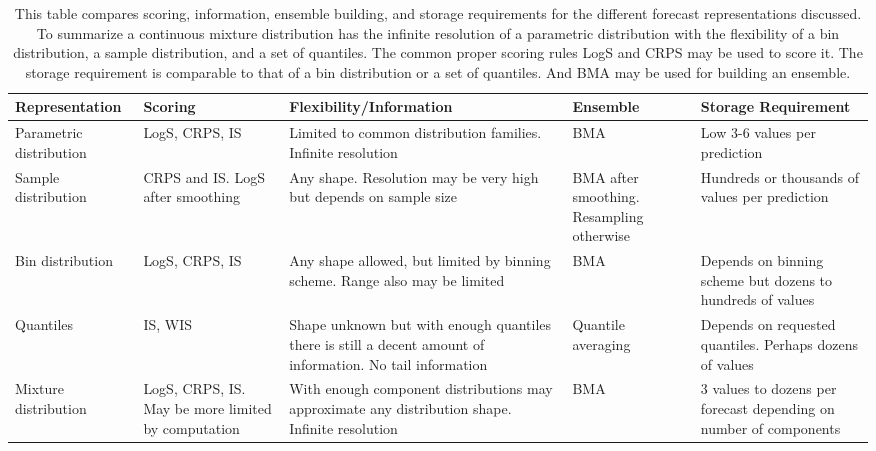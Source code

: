 \documentclass[11pt,notitlepage]{isuthesis}
\begin{document}
\begin{flushleft}

  \begin{table}
    \begin{center}
    \captionsetup{font=scriptsize}
    \begin{tabular}{ | p{2.4cm} || p{3cm} | p{4cm} | p{3cm} | p{3.5cm} |}
    \hline
    \textbf{Representation} & \textbf{Scoring} & 
    \textbf{Flexibility/Information} & \textbf{Ensemble} &
    \textbf{Storage Requirement}
    \\ \hline \hline

    Parametric distribution & LogS, CRPS, IS & Limited to common 
    distribution families. 
    Infinite resolution
    & BMA & Low 3-6 values per prediction \\ \hline
    
    Sample distribution & CRPS and IS. LogS after smoothing & Any shape. 
    Resolution may be
    very high but depends on sample size & BMA after smoothing. Resampling 
    otherwise & 
    Hundreds or thousands of values per prediction
    \\ \hline
    
    Bin distribution & LogS, CRPS, IS &
    Any shape allowed, but limited by binning scheme. Range also may be limited
    & BMA &
    Depends on binning scheme but dozens to hundreds of values
    \\ \hline


    Quantiles & IS, WIS & Shape unknown but with enough quantiles there is still
    a decent amount of information. No tail information & 
    Quantile averaging & Depends on 
    requested quantiles. Perhaps dozens of values
    \\ \hline
    
    Mixture distribution & LogS, CRPS, IS. May be more limited by computation & 
    With
    enough component distributions may
    approximate any distribution shape. Infinite resolution& BMA 
    & 3 values to dozens per forecast depending on number of components
    \\ \hline
    
  
   
	 \end{tabular}
    \begin{minipage}{14cm}
   \caption[Forecast representation comparison]{This table compares scoring,
   information, ensemble building, and storage requirements for the different
   forecast representations discussed. To summarize 
   a continuous mixture distribution has the 
infinite resolution of a parametric distribution with the flexibility of a bin
distribution, a sample distribution, and a set of quantiles. The common proper
scoring rules LogS and CRPS may be used to score it. The storage requirement is
comparable to that of a bin distribution or a set of quantiles. And BMA may be 
used for building an ensemble.}
   \label{table:repscomp}
   \end{minipage}
   \end{center}
   \end{table}
	 
\end{flushleft}
\end{document}
